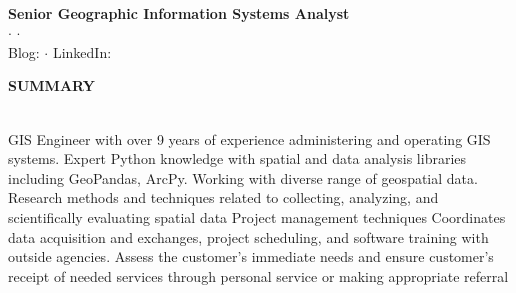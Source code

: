\documentclass[letterpaper]{article}
\newcommand{\lineunder} {
        \vspace*{-8pt} \\
        \hspace*{-18pt} \hrulefill \\
    }
\newcommand{\header} [1] {
        \vspace{9pt}
        {\hspace*{-18pt}\vspace*{6pt} \large \textbf {#1}}
        \vspace*{-6pt} \lineunder
        \vspace{2pt}
    }
\newcommand{\cvprofile}[7]{ %
        \begin{center}
            {\Huge \textbf {#1}}\\
            \vspace{4pt}
            {\large \textbf {#2}}\\
            \vspace{4pt}
            #3 $\cdot$\enspace #4 $\cdot$\enspace #5\\
            Blog: #6
            $\cdot$\enspace
            LinkedIn: #7
        \end{center}
    }
\newcommand{\CVjobTitle}{Senior Geographic Information Systems Analyst}
\begin{document}



\vspace*{-30pt}

\cvprofile
    {\CVname}
    {\CVjobTitle}
    {\CVaddress}
    {\CVemail}
    {\CVphone}
    {\CVblogurl}
    {\CVlinkedin}

\vspace*{-6pt}



\header{SUMMARY}
GIS Engineer with over 9 years 
of experience administering and operating GIS systems.
Expert Python knowledge with spatial and data analysis libraries including GeoPandas, ArcPy.
Working with diverse range of geospatial data.
Research methods and techniques related to collecting, analyzing, and scientifically evaluating spatial data
Project management techniques
Coordinates data acquisition and exchanges, project scheduling, and software training with outside agencies.
Assess the customer's immediate needs and ensure customer's receipt of needed services through personal service or making appropriate referral
\end{document}
